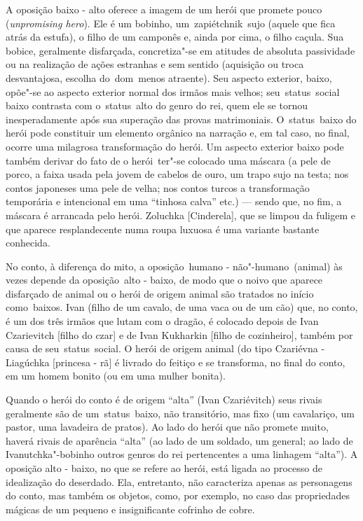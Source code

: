 A oposição baixo - alto oferece a imagem de um herói que promete pouco
(\emph{{unpromising hero}}). Ele é um bobinho, um~{zapiétchnik}~sujo
(aquele que fica atrás da estufa), o filho de um camponês e, ainda por
cima, o filho caçula. Sua bobice, geralmente disfarçada, concretiza"-se
em atitudes de absoluta passividade ou na realização de ações estranhas
e sem sentido (aquisição ou troca desvantajosa, escolha do~dom~menos
atraente). Seu aspecto exterior, baixo, opõe"-se ao aspecto exterior
normal dos irmãos mais velhos; seu~{status}~social baixo contrasta com
o~{status}~alto do genro do rei, quem ele se tornou inesperadamente após
sua superação das provas matrimoniais. O~{status}~baixo do herói pode
constituir um elemento orgânico na narração e, em tal caso, no final,
ocorre uma milagrosa transformação do herói. Um aspecto exterior baixo
pode também derivar do fato de o herói~ter"-se colocado uma máscara (a
pele de porco, a faixa usada pela jovem de cabelos de ouro, um trapo
sujo na testa; nos contos japoneses uma pele de velha; nos contos turcos
a transformação temporária e intencional em uma ``tinhosa calva'' etc.)
--- sendo que, no fim, a máscara é arrancada pelo herói. Zoluchka
{[}Cinderela{]}, que se limpou da fuligem e que aparece resplandecente
numa roupa luxuosa é uma variante bastante conhecida.

No conto, à diferença do mito, a oposição~{humano -
não"-humano}~({animal}) às vezes depende da oposição~{alto - baixo}, de
modo que o noivo que aparece disfarçado de animal ou o herói de origem
animal são tratados no início como~{baixos}. Ivan (filho de um cavalo,
de uma vaca ou de um cão) que, no conto, é um dos três irmãos que lutam
com o dragão, é colocado depois de Ivan Czarievitch {[}filho do czar{]}
e de Ivan Kukharkin {[}filho de cozinheiro{]}, também por causa de
seu~{status}~social. O herói de origem animal (do tipo Czariévna -
Liagúchka {[}princesa - rã{]} é livrado do feitiço e se transforma, no
final do conto, em um homem bonito (ou em uma mulher bonita).

Quando o herói do conto é de origem ``alta'' (Ivan Czariévitch) seus
rivais geralmente são de um~{status}~baixo, não transitório, mas fixo
(um cavalariço, um pastor, uma lavadeira de pratos). Ao lado do herói
que não promete muito, haverá rivais de aparência ``alta'' (ao lado de
um soldado, um general; ao lado de Ivanutchka"-bobinho outros genros do
rei pertencentes a uma linhagem ``alta''). A oposição alto - baixo, no
que se refere ao herói, está ligada ao processo de idealização do
deserdado. Ela, entretanto, não caracteriza apenas as personagens do
conto, mas também os objetos, como, por exemplo, no caso das
propriedades mágicas de um pequeno e insignificante cofrinho de cobre.

